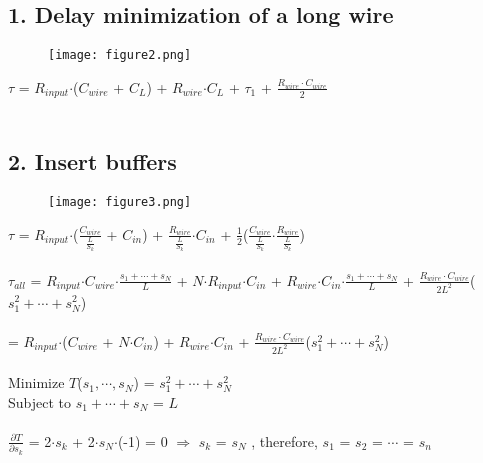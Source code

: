 \documentclass[a4paper,11pt]{article}
\begin{document}
\begin{flushleft}
\subsection*{1. Delay minimization of a long wire}
\begin{figure}[ht]
\centering
\texttt{[image: figure2.png]}
\end{figure}
$\tau$ = $R_{input}$$\cdot$($C_{wire}$ + $C_L$) + $R_{wire}$$\cdot$$C_L$ + $\tau_1$ + $\frac{R_{wire}\cdot C_{wire}}{2}$\\
\hspace*{\fill} \\

\subsection*{2. Insert buffers}
\begin{figure}[ht]
\centering
\texttt{[image: figure3.png]}
\end{figure}
$\tau$ = $R_{input}$$\cdot$($\frac{C_{wire}}{\frac{L}{S_k}}$ + $C_{in}$) + $\frac{R_{wire}}{\frac{L}{S_k}}$$\cdot$$C_{in}$ + $\frac{1}{2}$($\frac{C_{wire}}{\frac{L}{S_k}}$$\cdot$$\frac{R_{wire}}{\frac{L}{S_k}}$)\\
\hspace*{\fill} \\
$\tau_{all}$ = $R_{input}$$\cdot$$C_{wire}$$\cdot$$\frac{s_1+\cdots+s_N}{L}$ + $N$$\cdot$$R_{input}$$\cdot$$C_{in}$ + $R_{wire}$$\cdot$$C_{in}$$\cdot$$\frac{s_1+\cdots+s_N}{L}$ + $\frac{R_{wire}\cdot C_{wire}}{2L^2}$($s_1^2+\cdots+s_N^2$)\\
\hspace*{\fill} \\
\hspace*{0.6cm}= $R_{input}$$\cdot$($C_{wire}$ + $N$$\cdot$$C_{in}$) + $R_{wire}$$\cdot$$C_{in}$ + $\frac{R_{wire}\cdot C_{wire}}{2L^2}$($s_1^2+\cdots+s_N^2$)\\
\hspace*{\fill} \\
Minimize $T$($s_1,\cdots,s_N$) = $s_1^2+\cdots+s_N^2$\\
Subject to $s_1+\cdots+s_N$ = $L$\\
\hspace*{\fill} \\
$\frac{\partial T}{\partial s_k}$ = 2$\cdot$$s_k$ + 2$\cdot$$s_N$$\cdot$(-1) = 0  $\Longrightarrow$ $s_k$ = $s_N$ , therefore, $s_1$ = $s_2$ = $\cdots$ = $s_n$\\
\hspace*{\fill} \\
$$
\end{flushleft}
\end{document}
